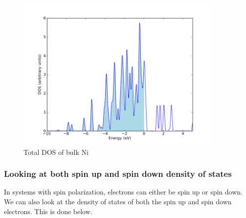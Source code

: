 \documentclass[colorlinks=true,urlcolor=blue,linkcolor=blue,citecolor=red]{article}
\begin{document}
\begin{figure}[H]
\centering
\includegraphics[width=4in]{./figures/Ni-total-DOS.png}
\caption{Total DOS of bulk Ni}
\end{figure}

\subsubsection{Looking at both spin up and spin down density of states}
\label{sec-3-2-2}
In systems with spin polarization, electrons can either be spin up or spin down. We can also look at the density of states of both the spin up and spin down electrons. This is done below.
\end{document}
